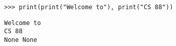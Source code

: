 \question \begin{lstlisting}
>>> print(print("Welcome to"), print("CS 88"))
\end{lstlisting}

\begin{solution}[0.5in]
\begin{verbatim}
Welcome to
CS 88
None None
\end{verbatim}
\end{solution}
